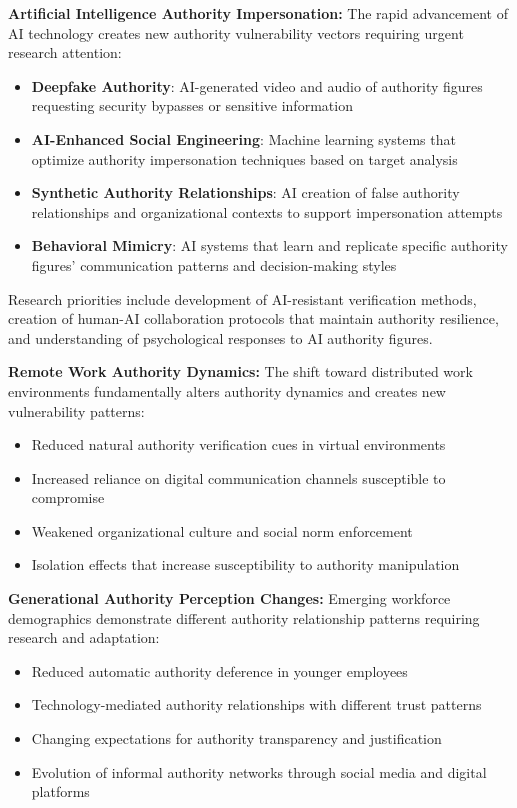 \documentclass[11pt,a4paper]{article}
\begin{document}
\textbf{Artificial Intelligence Authority Impersonation:}
The rapid advancement of AI technology creates new authority vulnerability vectors requiring urgent research attention:

\begin{itemize}
\item \textbf{Deepfake Authority}: AI-generated video and audio of authority figures requesting security bypasses or sensitive information
\item \textbf{AI-Enhanced Social Engineering}: Machine learning systems that optimize authority impersonation techniques based on target analysis
\item \textbf{Synthetic Authority Relationships}: AI creation of false authority relationships and organizational contexts to support impersonation attempts
\item \textbf{Behavioral Mimicry}: AI systems that learn and replicate specific authority figures' communication patterns and decision-making styles
\end{itemize}

Research priorities include development of AI-resistant verification methods, creation of human-AI collaboration protocols that maintain authority resilience, and understanding of psychological responses to AI authority figures.

\textbf{Remote Work Authority Dynamics:}
The shift toward distributed work environments fundamentally alters authority dynamics and creates new vulnerability patterns:

\begin{itemize}
\item Reduced natural authority verification cues in virtual environments
\item Increased reliance on digital communication channels susceptible to compromise
\item Weakened organizational culture and social norm enforcement
\item Isolation effects that increase susceptibility to authority manipulation
\end{itemize}

\textbf{Generational Authority Perception Changes:}
Emerging workforce demographics demonstrate different authority relationship patterns requiring research and adaptation:

\begin{itemize}
\item Reduced automatic authority deference in younger employees
\item Technology-mediated authority relationships with different trust patterns
\item Changing expectations for authority transparency and justification
\item Evolution of informal authority networks through social media and digital platforms
\end{itemize}
\end{document}
